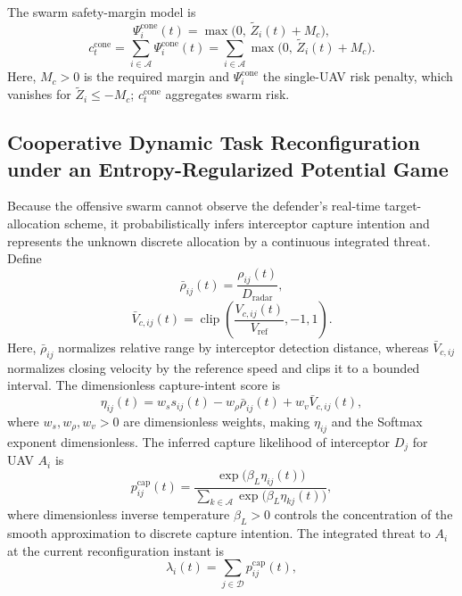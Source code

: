 \documentclass{cja}
\begin{document}
The swarm safety-margin model is
\begin{equation}
\Psi_i^{\mathrm{cone}}(t)
=
\max\bigl(0,\, \widetilde Z_i(t)+M_c\bigr),
\end{equation}
\begin{equation}
c_t^{\mathrm{cone}}
=
\sum_{i\in\mathcal{A}}
\Psi_i^{\mathrm{cone}}(t)
=
\sum_{i\in\mathcal{A}}
\max\bigl(0,\, \widetilde Z_i(t)+M_c\bigr).
\end{equation}
Here, $M_c>0$ is the required margin and $\Psi_i^{\mathrm{cone}}$ the single-UAV risk penalty, which vanishes for $\widetilde Z_i\le-M_c$; $c_t^{\mathrm{cone}}$ aggregates swarm risk.

\subsection{Cooperative Dynamic Task Reconfiguration under an Entropy-Regularized Potential Game}

Because the offensive swarm cannot observe the defender's real-time target-allocation scheme, it probabilistically infers interceptor capture intention and represents the unknown discrete allocation by a continuous integrated threat. Define
\begin{equation}
\bar\rho_{ij}(t)
=
\frac{\rho_{ij}(t)}{D_{\mathrm{radar}}},
\end{equation}
\begin{equation}
\bar V_{c,ij}(t)
=
\operatorname{clip}\!\left(
\frac{V_{c,ij}(t)}{V_{\mathrm{ref}}},
-1,1
\right).
\end{equation}
Here, $\bar\rho_{ij}$ normalizes relative range by interceptor detection distance, whereas $\bar V_{c,ij}$ normalizes closing velocity by the reference speed and clips it to a bounded interval. The dimensionless capture-intent score is
\begin{equation}
\eta_{ij}(t)
=
w_s s_{ij}(t)
-
w_{\rho}\bar\rho_{ij}(t)
+
w_v \bar V_{c,ij}(t),
\end{equation}
where $w_s,w_{\rho},w_v>0$ are dimensionless weights, making $\eta_{ij}$ and the Softmax exponent dimensionless. The inferred capture likelihood of interceptor $D_j$ for UAV $A_i$ is
\begin{equation}
p_{ij}^{\mathrm{cap}}(t)
=
\frac{\exp\!\bigl(\beta_L \eta_{ij}(t)\bigr)}
{\sum\limits_{k\in\mathcal{A}}\exp\!\bigl(\beta_L \eta_{kj}(t)\bigr)},
\label{eq:soft-lock-prob}
\end{equation}
where dimensionless inverse temperature $\beta_L>0$ controls the concentration of the smooth approximation to discrete capture intention. The integrated threat to $A_i$ at the current reconfiguration instant is
\begin{equation}
\lambda_i(t)
=
\sum_{j\in\mathcal D}p_{ij}^{\mathrm{cap}}(t),
\label{eq:soft-lock-pressure}
\end{equation}
\end{document}
